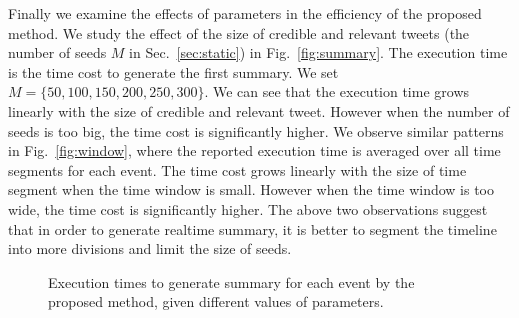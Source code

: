 \documentclass[envcountsame]{llncs}
\begin{document}
Finally we examine the effects of parameters in the efficiency of the proposed method. We study the effect of the size of credible and relevant tweets (the number of seeds $M$ in Sec.~\ref{sec:static}) in Fig.~\ref{fig:summary}. The execution time is the time cost to generate the first summary. We set $M=\{50,100,150,200,250,300\}$. We can see that the execution time grows linearly with the size of credible and relevant tweet. However when the number of seeds is too big, the time cost is significantly higher. We observe similar patterns in Fig.~\ref{fig:window}, where the reported execution time is averaged  over all time segments for each event. The time cost grows linearly with the size of time segment when the time window is small. However when the time window is too wide, the time cost is significantly higher. The above two observations suggest that in order to generate realtime summary, it is better to segment the timeline into more divisions and limit the size of seeds.

\vspace{-0.5cm}
\begin{figure}
  \centering
{}
\hspace{-4ex}
\setlength{\abovecaptionskip}{-0.1cm}
\caption{Execution times to generate summary for each event by the proposed method, given different values of parameters.}
\end{figure}
\vspace{-0.5cm}
\end{document}
